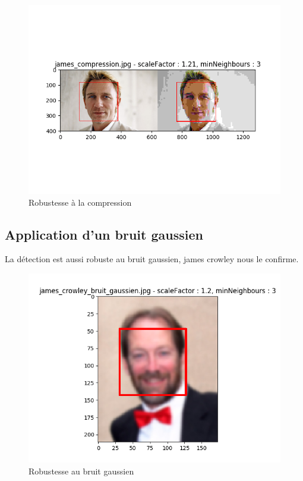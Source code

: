 \documentclass[a4paper,11pt]{article}
\begin{document}
	    \begin{figure}[H]
	        \begin{center}
	           \includegraphics[scale = 0.6]{images/james_compression_1,21_3.png}
	           \caption{Robustesse à la compression}
	           \label{fig:edward}
	        \end{center}
	    \end{figure}
	

    \subsection{Application d'un bruit gaussien}

	La détection est aussi robuste au bruit gaussien, james crowley nous le confirme.

	    \begin{figure}[H]
	        \begin{center}
	           \includegraphics[scale = 0.6]{images/james_crowley_bruit_gaussien_1,2_3.png}
	           \caption{Robustesse au bruit gaussien}
	           \label{fig:edward}
	        \end{center}
	    \end{figure}
	    
\end{document}
